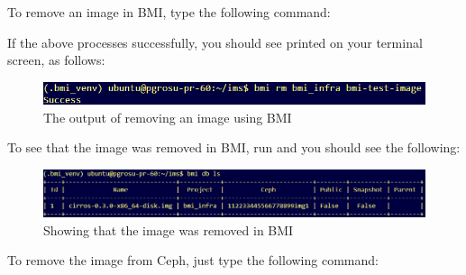 To remove an image in BMI, type the following command: 



If the above processes successfully, you should see  printed on your terminal screen, as follows: \\



\begin{figure}[!h] %
\label{fig:bmi-workflow}
\begin{center}
\includegraphics[scale=0.7]{figures/bmi-rm-db-ls.png}
\end{center}
\caption{The output of removing an image using BMI}
\end{figure}

To see that the image was removed in BMI, run  and you should see the following: \\

\begin{figure}[!h] %
\label{fig:bmi-workflow}
\begin{center}
\includegraphics[scale=0.7]{figures/bmi-image-remove-db-ls.png}
\end{center}
\caption{Showing that the image was removed in BMI}
\end{figure}



To remove the image from Ceph, just type the following command:

 
